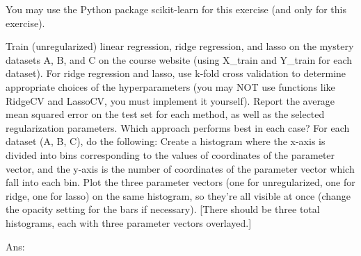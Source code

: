 \documentclass[10pt,letter,notitlepage]{article}
\newcommand{\red}[1]{{\color{red}#1}}
\newcommand{\ans}[1]{{\color{orange}\textsf{Ans}: #1}}
\newcounter{exercise}
\begin{document}
\begin{exercise}

  \red{You may use the Python package scikit-learn for this exercise (and only for this exercise).}

Train (unregularized) linear regression, ridge regression, and lasso on the mystery datasets A, B, and C on the course website (using X\_train and Y\_train for each dataset).
For ridge regression and lasso, use k-fold cross validation to determine appropriate choices of the hyperparameters (you may NOT use functions like RidgeCV and LassoCV, you must implement it yourself). 
Report the average mean squared error on the test set for each method, as well as the selected regularization parameters.
Which approach performs best in each case?
For each dataset (A, B, C), do the following:
Create a histogram where the x-axis is divided into bins corresponding to the values of coordinates of the parameter vector, and the y-axis is the number of coordinates of the parameter vector which fall into each bin. 
Plot the three parameter vectors (one for unregularized, one for ridge, one for lasso) on the same histogram, so they're all visible at once (change the opacity setting for the bars if necessary).
  [There should be three total histograms, each with three parameter vectors overlayed.]

  \ans{}
\end{exercise}
\end{document}
